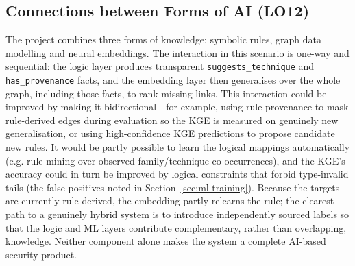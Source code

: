 \documentclass{article}
\begin{document}
\subsection{Connections between Forms of AI (LO12)}
\label{sec:connections}
The project combines three forms of knowledge: symbolic rules, graph data
modelling and neural embeddings. The interaction in this scenario is one-way
and sequential: the logic layer produces transparent
\texttt{suggests\_technique} and \texttt{has\_provenance} facts, and the
embedding layer then generalises over the whole graph, including those facts,
to rank missing links. This interaction could be improved by making it
bidirectional---for example, using rule provenance to mask rule-derived edges
during evaluation so the KGE is measured on genuinely new generalisation, or
using high-confidence KGE predictions to propose candidate new rules. It would
be partly possible to learn the logical mappings automatically (e.g. rule
mining over observed family/technique co-occurrences), and the KGE's accuracy
could in turn be improved by logical constraints that forbid type-invalid
tails (the false positives noted in Section~\ref{sec:ml-training}). Because
the targets are currently rule-derived, the embedding partly relearns the
rule; the clearest path to a genuinely hybrid system is to introduce
independently sourced labels so that the logic and ML layers contribute
complementary, rather than overlapping, knowledge. Neither component alone
makes the system a complete AI-based security product.
\end{document}
